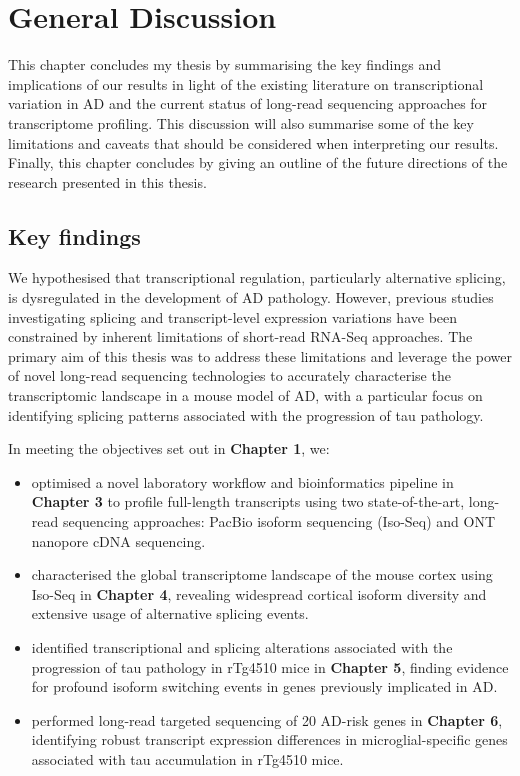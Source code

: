 \chapter{General Discussion}

This chapter concludes my thesis by summarising the key findings and implications of our results in light of the existing literature on transcriptional variation in AD and the current status of long-read sequencing approaches for transcriptome profiling. This discussion will also summarise some of the key limitations and caveats that should be considered when interpreting our results. Finally, this chapter concludes by giving an outline of the future directions of the research presented in this thesis.       

\section{Key findings}
We hypothesised that transcriptional regulation, particularly alternative splicing, is dysregulated in the development of AD pathology. However, previous studies investigating splicing and transcript-level expression variations have been constrained by inherent limitations of short-read RNA-Seq approaches. The primary aim of this thesis was to address these limitations and leverage the power of novel long-read sequencing technologies to accurately characterise the transcriptomic landscape in a mouse model of AD, with a particular focus on identifying splicing patterns associated with the progression of tau pathology.

In meeting the objectives set out in \textbf{Chapter 1}, we:
\begin{itemize}
	\item optimised a novel laboratory workflow and bioinformatics pipeline in \textbf{Chapter 3} to profile full-length transcripts using two state-of-the-art, long-read sequencing approaches: PacBio isoform sequencing (Iso-Seq) and ONT nanopore cDNA sequencing.  
	
	\item characterised the global transcriptome landscape of the mouse cortex using Iso-Seq in \textbf{Chapter 4}, revealing widespread cortical isoform diversity and extensive usage of alternative splicing events. 
	
	\item identified transcriptional and splicing alterations associated with the progression of tau pathology in rTg4510 mice in \textbf{Chapter 5}, finding evidence for profound isoform switching events in genes previously implicated in AD. 
	
	\item performed long-read targeted sequencing of 20 AD-risk genes in \textbf{Chapter 6}, identifying robust transcript expression differences in microglial-specific genes associated with tau accumulation in rTg4510 mice.    
\end{itemize}

